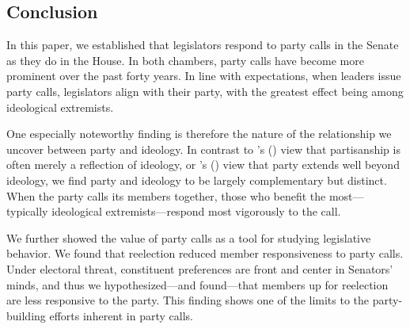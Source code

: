 \documentclass[12pt]{article}
\def\citeapos#1{\citeauthor{#1}'s (\citeyear{#1})} %
\begin{document}
\subsection*{Conclusion}

In this paper, we established that legislators respond to party calls in the Senate as they do in the House. In both chambers, party calls have become more prominent over the past forty years.  In line with expectations, when leaders issue party calls, legislators align with their party, with the greatest effect being among ideological extremists.

One especially noteworthy finding is therefore the nature of the relationship we uncover between party and ideology.  In contrast to \citeapos{Krehbiel:1993} view that partisanship is often merely a reflection of ideology, or \citeapos{Lee:2009} view that party extends well beyond ideology, we find party and ideology to be largely complementary but distinct.  When the party calls its members together, those who benefit the most---typically ideological extremists---respond most vigorously to the call.

We further showed the value of party calls as a tool for studying legislative behavior.  We found that reelection reduced member responsiveness to party calls.  Under electoral threat, constituent preferences are front and center in Senators' minds, and thus we hypothesized---and found---that members up for reelection are less responsive to the party. This finding shows one of the limits to the party-building efforts inherent in party calls.

\clearpage



\end{document}
